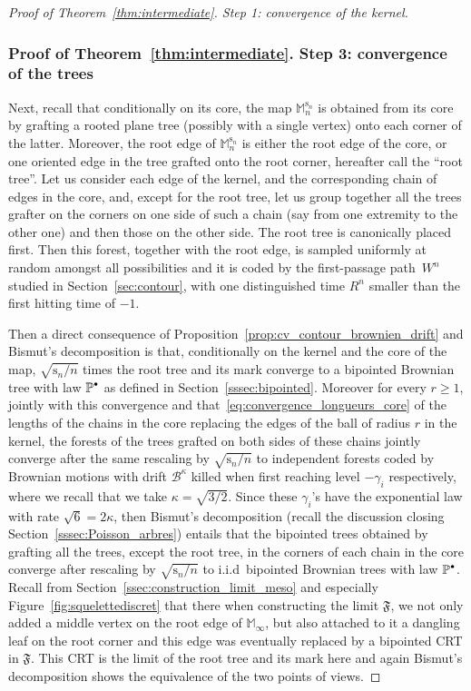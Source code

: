 \documentclass[JEP,XML,SOM,Unicode,NoFloatCountersInSection,NoEqCountersInSection]{cedram}
\newcommand{\sbullet}{{\raisebox{1pt}{$\scriptscriptstyle\bullet $}}}
\theoremstyle{plain}
\theoremstyle{definition}
\theoremstyle{remark}
\renewcommand{\P}{\mathbb{P}}
\newcommand{\Mapb}{\mathbb{M}}
\newcommand{\spar}{\mathrm{s}}
\begin{document}
\begin{proof}[Proof of Theorem~\ref{thm:intermediate}. Step 1: convergence of the kernel]
\subsubsection*{Proof of Theorem~\ref{thm:intermediate}. Step 3: convergence of the trees}
Next, recall that conditionally on its core, the map $\Mapb_n^{\spar_n}$ is obtained from its core by grafting a rooted plane tree (possibly with a single vertex) onto each corner of the latter. Moreover, the root edge of $\Mapb_n^{\spar_n}$ is either the root edge of the core, or one oriented edge in the tree grafted onto the root corner, hereafter call the ``root tree''.
Let us consider each edge of the kernel, and the corresponding chain of edges in the core, and, except for the root tree, let us group together all the trees grafter on the corners on one side of such a chain (say from one extremity to the other one) and then those on the other side. The root tree is canonically placed first.
Then this forest, together with the root edge, is sampled uniformly at random amongst all possibilities and it is coded by the first-passage path~$W^n$ studied in Section~\ref{sec:contour}, with one distinguished time $R^n$ smaller than the first hitting time of $-1$.

Then a direct consequence of Proposition~\ref{prop:cv_contour_brownien_drift} and Bismut's decomposition is that, conditionally on the kernel and the core of the map, $\sqrt{\spar_n/n}$ times the root tree and its mark converge to a bipointed Brownian tree with law $ \P^{\sbullet}$ as defined in Section~\ref{sssec:bipointed}. Moreover for every $r \ge 1$, jointly with this convergence and that~\eqref{eq:convergence_longueurs_core} of the lengths of the chains in the core replacing the edges of the ball of radius $r$ in the kernel, the forests of the trees grafted on both sides of these chains jointly converge after the same rescaling by $\sqrt{\spar_n/n}$ to independent forests coded by Brownian motions with drift $\mathcal{B}^\kappa$ killed when first reaching level $-\gamma_i$ respectively, where we recall that we take $\kappa = \sqrt{3/2}$. Since these $\gamma_i$'s have the exponential law with rate $\sqrt{6} = 2\kappa$, then Bismut's decomposition (recall the discussion closing Section~\ref{sssec:Poisson_arbres}) entails that the bipointed trees obtained by grafting all the trees, except the root tree, in the corners of each chain in the core converge after rescaling by $\sqrt{\spar_n/n}$ to i.i.d~bipointed Brownian trees with law $ \P^{\sbullet}$.
Recall from Section~\ref{ssec:construction_limit_meso} and especially Figure~\ref{fig:squelettediscret} that there when constructing the limit $\mathfrak{F}$, we not only added a middle vertex on the root edge of $\Mapb_\infty$, but also attached to it a dangling leaf on the root corner and this edge was eventually replaced by a bipointed CRT in $\mathfrak{F}$. This CRT is the limit of the root tree and its mark here and again Bismut's decomposition shows the equivalence of the two points of views.


\end{proof}
\end{document}
